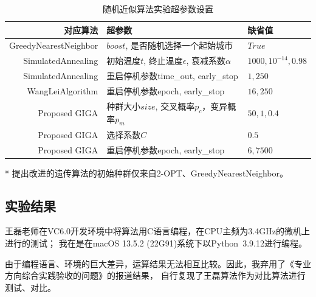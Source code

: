 \documentclass[12pt]{ctexart}
\begin{document}
\begin{table}[htbp]
    \caption{随机近似算法实验超参数设置}
    \centering

    \begin{threeparttable}
        \begin{tabular}{rll}
            \toprule
            对应算法                  & 超参数                                   & 缺省值                    \\
            \midrule
            GreedyNearestNeighbor & $boost$, 是否随机选择一个起始城市                 & $True$                 \\
            SimulatedAnnealing    & 初始温度$t$, 终止温度$\epsilon$, 衰减系数$\alpha$ & $1000, 10^{-14}, 0.98$ \\
            SimulatedAnnealing    & 重启停机参数time\_out, early\_stop          & $1, 250$               \\
            WangLeiAlgorithm      & 重启停机参数epoch, early\_stop              & $16, 250$              \\
            Proposed GIGA         & 种群大小$size$, 交叉概率$p_c$，变异概率$p_m$       & $50, 1, 0.4$           \\
            Proposed GIGA         & 选择系数$C$                               & $0.5$                  \\
            Proposed GIGA         & 重启停机参数epoch, early\_stop              & $6, 7500$              \\
            \bottomrule
        \end{tabular}
        \begin{tablenotes}
            \item [*]   提出改进的遗传算法的初始种群仅来自2-OPT、GreedyNearestNeighbor。
        \end{tablenotes}
    \end{threeparttable}
    \qquad
\end{table}

\subsection{实验结果}
王磊老师在VC6.0开发环境中将算法用C语言编程，在CPU主频为3.4GHz的微机上进行的测试；
我在是在macOS 13.5.2 (22G91)系统下以Python~3.9.12进行编程。

由于编程语言、环境的巨大差异，运算结果无法相互比较。因此，我弃用了《专业方向综合实践验收的问题》的报道结果，
自行复现了王磊算法作为对比算法进行测试、对比。
\end{document}

